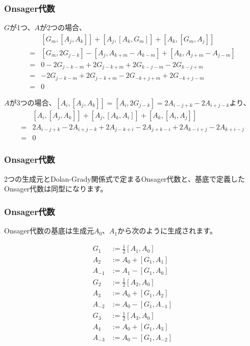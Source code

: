 \documentclass{beamer}
\begin{document}
\begin{frame}
    \frametitle{Onsager代数}

    $G$が1つ、$A$が2つの場合、
    \begin{align}
            & [G_m,[A_j,A_k]]+[A_j,[A_k,G_m]]+[A_k,[G_m,A_j]]            \\
        ={} & [G_m,2G_{j-k}]-[A_j,A_{k+m}-A_{k-m}]+[A_k,A_{j+m}-A_{j-m}] \\
        ={} & 0-2G_{j-k-m}+2G_{j-k+m}+2G_{k-j-m}-2G_{k-j+m}              \\
        ={} & -2G_{j-k-m}+2G_{j-k+m}-2G_{-k+j+m}+2G_{-k+j-m}             \\
        ={} & 0
    \end{align}

    $A$が3つの場合、$[A_i,[A_j,A_k]]=[A_i,2G_{j-k}]=2A_{i-j+k}-2A_{i+j-k}$より、
    \begin{align}
            & [A_i,[A_j,A_k]]+[A_j,[A_k,A_i]]+[A_k,[A_i,A_j]]                   \\
        ={} & 2A_{i-j+k}-2A_{i+j-k}+2A_{j-k+i}-2A_{j+k-i}+2A_{k-i+j}-2A_{k+i-j} \\
        ={} & 0
    \end{align}
\end{frame}

\begin{frame}
    \frametitle{Onsager代数}

    \begin{theorem}[Onsager代数の同型]
        2つの生成元とDolan-Grady関係式で定まるOnsager代数と、基底で定義したOnsager代数は同型になります。
    \end{theorem}
\end{frame}

\begin{frame}
    \frametitle{Onsager代数}

    Onsager代数の基底は生成元$A_0$、$A_1$から次のように生成されます。

    \begin{align}
        G_1    & := \frac{1}{2}[A_1,A_0] \\
        A_2    & := A_0+[G_1,A_1]        \\
        A_{-1} & := A_1-[G_1,A_0]        \\
        G_2    & := \frac{1}{2}[A_2,A_0] \\
        A_3    & := A_0+[G_1,A_2]        \\
        A_{-2} & := A_0-[G_1,A_{-1}]     \\
        G_3    & := \frac{1}{2}[A_3,A_0] \\
        A_4    & := A_0+[G_1,A_3]        \\
        A_{-3} & := A_0-[G_1,A_{-2}]
    \end{align}
\end{frame}
\end{document}
